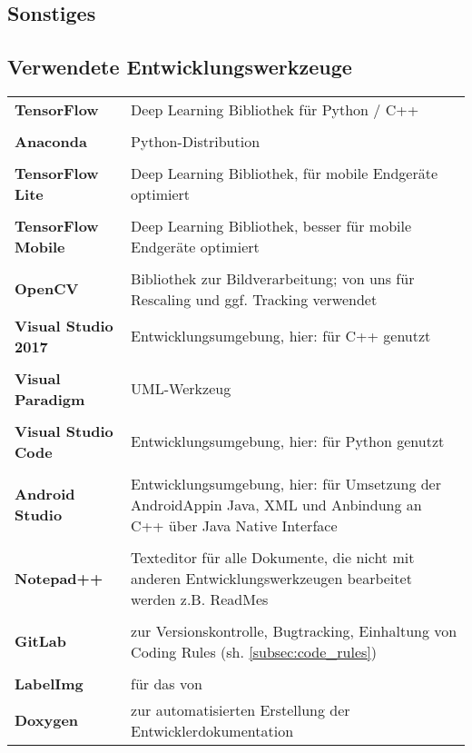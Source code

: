 \begin{appendix}

\chapter{Sonstiges}

\section{Verwendete Entwicklungswerkzeuge}
\begin{longtabu}{l X[j]}
    \bfseries TensorFlow & \gls{Deep Learning} Bibliothek für Python / C++\\
    &\\
    \bfseries Anaconda & Python-Distribution\\
    &\\
    \bfseries \gls{TensorFlow Lite} &  \gls{Deep Learning}  Bibliothek, für mobile Endgeräte optimiert\\
    &\\
    \bfseries \gls{TensorFlow Mobile} &  \gls{Deep Learning}  Bibliothek, besser für mobile Endgeräte optimiert\\
    &\\
    \bfseries OpenCV & Bibliothek zur Bildverarbeitung; von uns für Rescaling und ggf. \gls{Tracking} verwendet
    &\\
    \bfseries Visual Studio 2017 & Entwicklungsumgebung, hier: für C++ genutzt\\
    &\\
    \bfseries Visual Paradigm & UML-Werkzeug\\
    &\\
    \bfseries Visual Studio Code & Entwicklungsumgebung, hier: für Python genutzt\\
    &\\
    \bfseries Android Studio & Entwicklungsumgebung, hier: für Umsetzung der AndroidAppin Java, XML und Anbindung an C++ über Java Native Interface\\
    &\\
    \bfseries Notepad++ & Texteditor für alle Dokumente, die nicht mit anderen Entwicklungswerkzeugen bearbeitet werden z.B. ReadMes\\
    &\\
    \bfseries GitLab & zur Versionskontrolle, Bugtracking, Einhaltung von Coding Rules (sh. \cref{subsec:code_rules}) \\
    &\\
    \bfseries LabelImg\footnotemark & für das  von 
    &\\
    \bfseries Doxygen & zur automatisierten Erstellung der Entwicklerdokumentation
    &\\
\end{longtabu}


\end{appendix}
